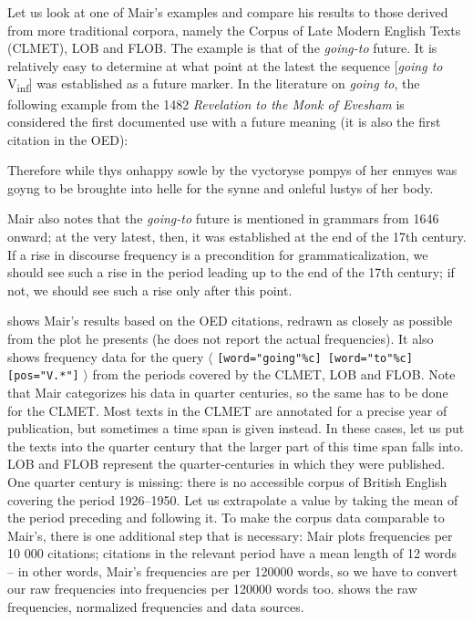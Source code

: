 Let us look at one of Mair's examples and compare his results to those derived from more traditional corpora, namely the Corpus of Late Modern English Texts (CLMET),  LOB  and FLOB.  The example is that of the \textit{going\hyp{}to}  future. It is relatively easy to determine at what point at the latest the sequence [\textit{going to} V\textsubscript{inf}] was established as a future marker. In the literature on \textit{going to}, the following example from the 1482 \textit{Revelation to the Monk of Evesham} is considered the first documented use with a future meaning  (it is also the first citation in the  OED):

\begin{exe}
\ex Therefore while thys onhappy sowle by the vyctoryse pompys of her enmyes was goyng to be broughte into helle for the synne and onleful lustys of her body.
\label{ex:firstgoingtofuture}
\end{exe}

Mair also notes that the \textit{going\hyp{}to}  future is mentioned in grammars from 1646 onward; at the very latest, then, it was established at the end of the 17th century. If a rise in discourse frequency  is a precondition for grammaticalization,  we should see such a rise in the period leading up to the end of the 17th century; if not, we should see such a rise only after this point.

 shows Mair's results based on the OED  citations, redrawn as closely as possible from the plot he presents (he does not report the actual frequencies). It also shows frequency data for the query $\langle$ \texttt{[word="going"\%c] [word="to"\%c] [pos="V.*"]} $\rangle$ from the periods covered by the CLMET,  LOB  and FLOB.  Note that Mair categorizes his data in quarter centuries, so the same has to be done for the CLMET.  Most texts in the CLMET  are annotated  for a precise year of publication, but sometimes a time span is given instead. In these cases, let us put the texts into the quarter century that the larger part of this time span falls into. LOB  and FLOB  represent the quarter\hyp{}centuries in which they were published. One quarter century is missing: there is no accessible corpus of British  English covering the period 1926--1950. Let us extrapolate a value by taking the mean  of the period preceding and following it. To make the corpus data comparable to Mair's, there is one additional step that is necessary: Mair plots frequencies  per 10 000 citations; citations in the relevant period have a mean length  of 12 words \citep[see][25]{hoffmann_using_2004} -- in other words, Mair's frequencies are per \num{120000} words, so we have to convert our raw frequencies into frequencies per \num{120000} words too.  shows the raw frequencies, normalized frequencies and data sources.


